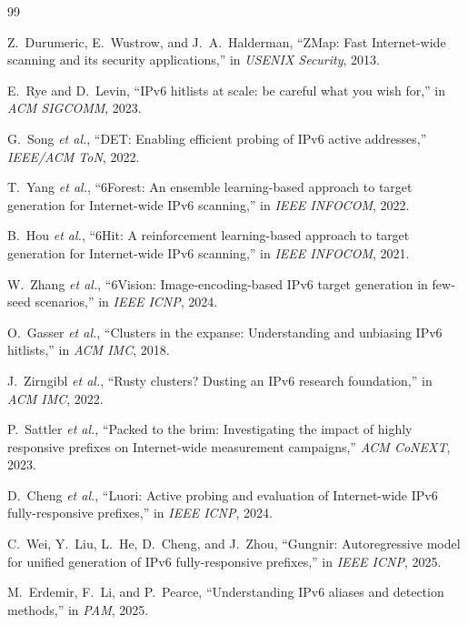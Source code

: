 \documentclass[conference]{IEEEtran}
\begin{document}
\clearpage
\begin{thebibliography}{99}

Z.~Durumeric, E.~Wustrow, and J.~A.~Halderman,
``ZMap: Fast Internet-wide scanning and its security applications,''
in \emph{USENIX Security}, 2013.

E.~Rye and D.~Levin,
``IPv6 hitlists at scale: be careful what you wish for,''
in \emph{ACM SIGCOMM}, 2023.

G.~Song \emph{et al.},
``DET: Enabling efficient probing of IPv6 active addresses,''
\emph{IEEE/ACM ToN}, 2022.

T.~Yang \emph{et al.},
``6Forest: An ensemble learning-based approach to target generation for
Internet-wide IPv6 scanning,''
in \emph{IEEE INFOCOM}, 2022.

B.~Hou \emph{et al.},
``6Hit: A reinforcement learning-based approach to target generation
for Internet-wide IPv6 scanning,''
in \emph{IEEE INFOCOM}, 2021.

W.~Zhang \emph{et al.},
``6Vision: Image-encoding-based IPv6 target generation in few-seed
scenarios,''
in \emph{IEEE ICNP}, 2024.

O.~Gasser \emph{et al.},
``Clusters in the expanse: Understanding and unbiasing IPv6 hitlists,''
in \emph{ACM IMC}, 2018.

J.~Zirngibl \emph{et al.},
``Rusty clusters? Dusting an IPv6 research foundation,''
in \emph{ACM IMC}, 2022.

P.~Sattler \emph{et al.},
``Packed to the brim: Investigating the impact of highly responsive
prefixes on Internet-wide measurement campaigns,''
\emph{ACM CoNEXT}, 2023.

D.~Cheng \emph{et al.},
``Luori: Active probing and evaluation of Internet-wide IPv6
fully-responsive prefixes,''
in \emph{IEEE ICNP}, 2024.

C.~Wei, Y.~Liu, L.~He, D.~Cheng, and J.~Zhou,
``Gungnir: Autoregressive model for unified generation of IPv6
fully-responsive prefixes,''
in \emph{IEEE ICNP}, 2025.

M.~Erdemir, F.~Li, and P.~Pearce,
``Understanding IPv6 aliases and detection methods,''
in \emph{PAM}, 2025.


\end{thebibliography}
\end{document}
